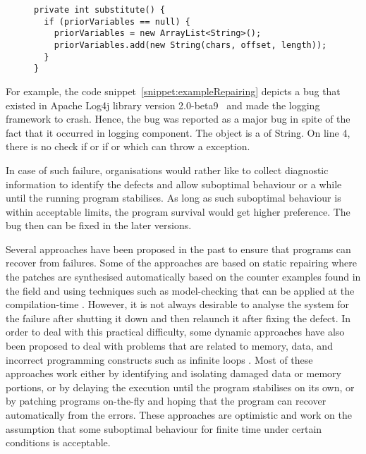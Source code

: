 \lstset{language=Java, caption=Apache Log4j bug example,
label = snippet:exampleRepairing}
\begin{figure}[t]
\begin{lstlisting}
private int substitute() {
  if (priorVariables == null) {
    priorVariables = new ArrayList<String>();
    priorVariables.add(new String(chars, offset, length));
  }
}
\end{lstlisting}
\end{figure}

For example, the code snippet~\ref{snippet:exampleRepairing} depicts a bug that existed in Apache
Log4j library version 2.0-beta9~\cite{ApacheLog4jBug} and made the
logging framework to crash. Hence, the bug was reported as a major bug in spite of the fact that
it occurred in logging component. The object  is a  of String.
On line 4, there is no check if  or if  or
 which can throw a  exception. 

In case of such failure, organisations would rather like to collect diagnostic information to identify the defects and allow
suboptimal behaviour or a while until the running program stabilises. As long as such suboptimal behaviour
is within acceptable limits, the program survival would get higher preference. The bug then can be fixed in the later versions.

Several approaches have been proposed in the past to ensure that programs can recover from
failures. Some of the approaches are based on static repairing where the patches are synthesised
automatically based on the counter examples found in the field and using techniques such as model-checking that
can be applied at the compilation-time \cite{}. However, it is not always desirable to analyse the system for the failure
after shutting it down and then relaunch it after fixing the defect. In order to deal with this practical difficulty, some
dynamic approaches have also been proposed to deal with problems
that are related to memory, data, and incorrect programming constructs such as infinite loops \cite{}. Most of these
approaches work either by identifying and isolating damaged data or memory portions, or by delaying the execution
until the program stabilises on its own, or by patching programs on-the-fly and hoping that the program 
can recover automatically from the errors. These approaches are optimistic and work on the assumption that some
suboptimal behaviour for finite time under certain conditions is acceptable.

